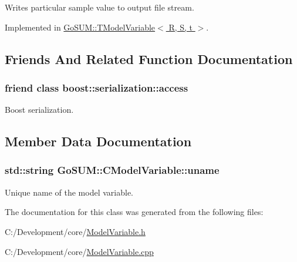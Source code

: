 Writes particular sample value to output file stream. 



Implemented in \hyperlink{class_go_s_u_m_1_1_t_model_variable_a98d527cb3d0ce4c3a96ddb4e04c0d931}{Go\-S\-U\-M\-::\-T\-Model\-Variable$<$ R, S, t $>$}.



\subsection{Friends And Related Function Documentation}
\hypertarget{class_go_s_u_m_1_1_c_model_variable_ac98d07dd8f7b70e16ccb9a01abf56b9c}{
\subsubsection[{boost\-::serialization\-::access}]{\setlength{\rightskip}{0pt plus 5cm}friend class boost\-::serialization\-::access\hspace{0.3cm}{\ttfamily [friend]}}}\label{class_go_s_u_m_1_1_c_model_variable_ac98d07dd8f7b70e16ccb9a01abf56b9c}


Boost serialization. 



\subsection{Member Data Documentation}
\hypertarget{class_go_s_u_m_1_1_c_model_variable_ae7476c53db1987e31c50ac89b88f5402}{
\subsubsection[{uname}]{\setlength{\rightskip}{0pt plus 5cm}std\-::string Go\-S\-U\-M\-::\-C\-Model\-Variable\-::uname\hspace{0.3cm}{\ttfamily [protected]}}}\label{class_go_s_u_m_1_1_c_model_variable_ae7476c53db1987e31c50ac89b88f5402}
Unique name of the model variable. 

The documentation for this class was generated from the following files\-:\begin{DoxyCompactItemize}
\item 
C\-:/\-Development/core/\hyperlink{_model_variable_8h}{Model\-Variable.\-h}\item 
C\-:/\-Development/core/\hyperlink{_model_variable_8cpp}{Model\-Variable.\-cpp}\end{DoxyCompactItemize}
